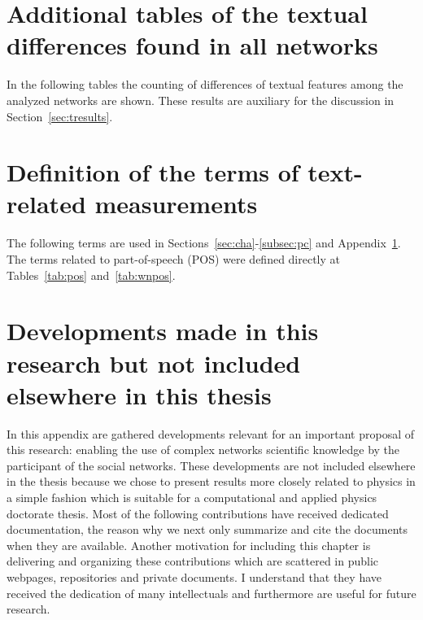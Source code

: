 
\begin{apendicesenv}
	\partapendices
	\chapter{Additional tables of the textual differences found in all networks}\label{ap:textd}
In the following tables the counting of differences of textual features among the analyzed networks
are shown.
	These results are auxiliary for the discussion in Section~\ref{sec:tresults}.
\FloatBarrier











	\chapter{Definition of the terms of text-related measurements}\label{ap:msTerms}
	The following terms are used in Sections~\ref{sec:cha}-\ref{subsec:pc} and Appendix~\ref{ap:textd}.
	The terms related to part-of-speech (POS) were defined directly at Tables~\ref{tab:pos} and~\ref{tab:wnpos}.


	\chapter{Developments made in this research but not included elsewhere in this thesis}\label{ap:more}
In this appendix are gathered developments relevant for an important proposal of this research:
enabling the use of complex networks scientific knowledge by the participant of the social networks.
These developments are not included elsewhere in the thesis because we chose to present results
more closely related to physics in a simple fashion which is suitable for a computational and applied physics doctorate thesis.
Most of the following contributions have received dedicated documentation,
the reason why we next only summarize and cite the documents when they are available.
Another motivation for including this chapter is delivering and organizing these contributions
which are scattered in public webpages, repositories and private documents.
I understand that they have received the dedication of many intellectuals
and furthermore are useful for future research.


\end{apendicesenv}
